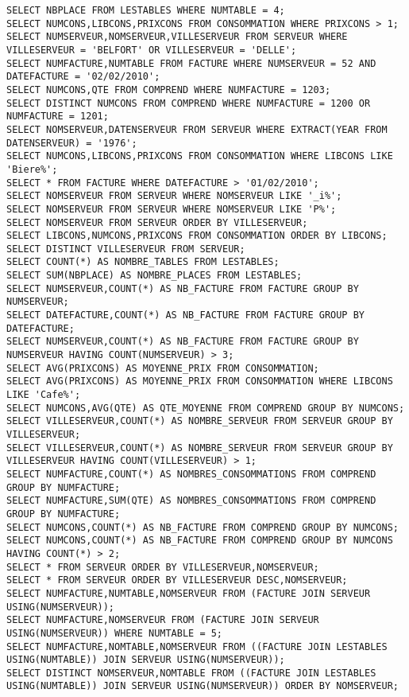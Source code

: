 \documentclass{report}
\begin{document}
\begin{lstlisting}[firstnumber=2]
SELECT NBPLACE FROM LESTABLES WHERE NUMTABLE = 4;
SELECT NUMCONS,LIBCONS,PRIXCONS FROM CONSOMMATION WHERE PRIXCONS > 1;
SELECT NUMSERVEUR,NOMSERVEUR,VILLESERVEUR FROM SERVEUR WHERE VILLESERVEUR = 'BELFORT' OR VILLESERVEUR = 'DELLE';
SELECT NUMFACTURE,NUMTABLE FROM FACTURE WHERE NUMSERVEUR = 52 AND DATEFACTURE = '02/02/2010';
SELECT NUMCONS,QTE FROM COMPREND WHERE NUMFACTURE = 1203;
SELECT DISTINCT NUMCONS FROM COMPREND WHERE NUMFACTURE = 1200 OR NUMFACTURE = 1201;
SELECT NOMSERVEUR,DATENSERVEUR FROM SERVEUR WHERE EXTRACT(YEAR FROM DATENSERVEUR) = '1976';
SELECT NUMCONS,LIBCONS,PRIXCONS FROM CONSOMMATION WHERE LIBCONS LIKE 'Biere%';
SELECT * FROM FACTURE WHERE DATEFACTURE > '01/02/2010';
SELECT NOMSERVEUR FROM SERVEUR WHERE NOMSERVEUR LIKE '_i%';
SELECT NOMSERVEUR FROM SERVEUR WHERE NOMSERVEUR LIKE 'P%';
SELECT NOMSERVEUR FROM SERVEUR ORDER BY VILLESERVEUR;
SELECT LIBCONS,NUMCONS,PRIXCONS FROM CONSOMMATION ORDER BY LIBCONS;
SELECT DISTINCT VILLESERVEUR FROM SERVEUR;
SELECT COUNT(*) AS NOMBRE_TABLES FROM LESTABLES;
SELECT SUM(NBPLACE) AS NOMBRE_PLACES FROM LESTABLES;
SELECT NUMSERVEUR,COUNT(*) AS NB_FACTURE FROM FACTURE GROUP BY NUMSERVEUR;
SELECT DATEFACTURE,COUNT(*) AS NB_FACTURE FROM FACTURE GROUP BY DATEFACTURE;
SELECT NUMSERVEUR,COUNT(*) AS NB_FACTURE FROM FACTURE GROUP BY NUMSERVEUR HAVING COUNT(NUMSERVEUR) > 3;
SELECT AVG(PRIXCONS) AS MOYENNE_PRIX FROM CONSOMMATION;
SELECT AVG(PRIXCONS) AS MOYENNE_PRIX FROM CONSOMMATION WHERE LIBCONS LIKE 'Cafe%';
SELECT NUMCONS,AVG(QTE) AS QTE_MOYENNE FROM COMPREND GROUP BY NUMCONS;
SELECT VILLESERVEUR,COUNT(*) AS NOMBRE_SERVEUR FROM SERVEUR GROUP BY VILLESERVEUR;
SELECT VILLESERVEUR,COUNT(*) AS NOMBRE_SERVEUR FROM SERVEUR GROUP BY VILLESERVEUR HAVING COUNT(VILLESERVEUR) > 1;
SELECT NUMFACTURE,COUNT(*) AS NOMBRES_CONSOMMATIONS FROM COMPREND GROUP BY NUMFACTURE;
SELECT NUMFACTURE,SUM(QTE) AS NOMBRES_CONSOMMATIONS FROM COMPREND GROUP BY NUMFACTURE;
SELECT NUMCONS,COUNT(*) AS NB_FACTURE FROM COMPREND GROUP BY NUMCONS;
SELECT NUMCONS,COUNT(*) AS NB_FACTURE FROM COMPREND GROUP BY NUMCONS HAVING COUNT(*) > 2;
SELECT * FROM SERVEUR ORDER BY VILLESERVEUR,NOMSERVEUR;
SELECT * FROM SERVEUR ORDER BY VILLESERVEUR DESC,NOMSERVEUR;
SELECT NUMFACTURE,NUMTABLE,NOMSERVEUR FROM (FACTURE JOIN SERVEUR USING(NUMSERVEUR));
SELECT NUMFACTURE,NOMSERVEUR FROM (FACTURE JOIN SERVEUR USING(NUMSERVEUR)) WHERE NUMTABLE = 5;
SELECT NUMFACTURE,NOMTABLE,NOMSERVEUR FROM ((FACTURE JOIN LESTABLES USING(NUMTABLE)) JOIN SERVEUR USING(NUMSERVEUR));
SELECT DISTINCT NOMSERVEUR,NOMTABLE FROM ((FACTURE JOIN LESTABLES USING(NUMTABLE)) JOIN SERVEUR USING(NUMSERVEUR)) ORDER BY NOMSERVEUR;

\end{lstlisting}
\end{document}
